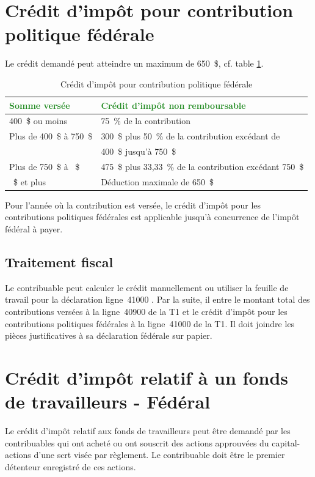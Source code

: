 \section{Crédit d'impôt pour contribution politique fédérale}
Le crédit demandé peut atteindre un maximum de 650~\$, cf. table \ref{table:creditImpotContributionPolitiqueFederale}.
\begin{table}
	\centering
	\begin{tabular}{ll}
		\textcolor{ForestGreen}{Somme versée} & \textcolor{ForestGreen}{Crédit d'impôt non remboursable} \\ \hline\hline
		400~\$ ou moins                       & 75~\% de la contribution                                 \\ \hline
		Plus de 400~\$ à 750~\$               & 300~\$ plus 50~\% de la contribution excédant de         \\
		& 400~\$ jusqu'à 750~\$                                    \\ \hline
		Plus de 750~\$ à \numprint{1275}~\$   & 475~\$ plus 33,33~\% de la contribution excédant 750~\$  \\ \hline
		\numprint{1275}~\$ et plus            & Déduction maximale de 650~\$                             \\ \hline
	\end{tabular}
	\caption{Crédit d'impôt pour contribution politique fédérale}
	\label{table:creditImpotContributionPolitiqueFederale}
\end{table}

Pour l'année où la contribution est versée, le crédit d'impôt pour les contributions politiques fédérales est applicable jusqu'à concurrence de l'impôt fédéral à payer. 


\subsection{Traitement fiscal}
Le contribuable peut calculer le crédit manuellement ou utiliser la feuille de travail pour la déclaration \og ligne~41000 \fg{}. Par la suite, il entre le montant total des contributions versées à la ligne~40900 de la T1 et le crédit d'impôt pour les contributions politiques fédérales à la ligne~41000 de la T1. Il doit joindre les pièces justificatives à sa déclaration fédérale sur papier.



\section{Crédit d'impôt relatif à un fonds de travailleurs - Fédéral}
\begin{intro}
	Le crédit d'impôt relatif aux fonds de travailleurs peut être demandé par les contribuables qui ont acheté ou ont souscrit des actions approuvées du capital-actions d'une \acrfull{scrt} visée par règlement. Le contribuable doit être le premier détenteur enregistré de ces actions.
\end{intro}

